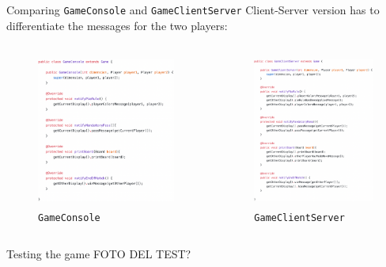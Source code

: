 \documentclass{beamer}
\begin{document}
\begin{frame}{Comparing \texttt{GameConsole} and \texttt{GameClientServer}}
Client-Server version has to differentiate the messages for the two players:
\begin{columns}
			\begin{figure}
				\includegraphics[height=5cm, keepaspectratio]{images/gameconsole.png}
				\caption*{\texttt{GameConsole}}
			\end{figure}
					
			\begin{figure}
				\includegraphics[height=5cm, keepaspectratio]{images/gamecs.png}
				\caption*{\texttt{GameClientServer}}
			\end{figure}
		
	\end{columns}
\end{frame}

\begin{frame}{Testing the game}
FOTO DEL TEST?
\end{frame}









     
\end{document}
